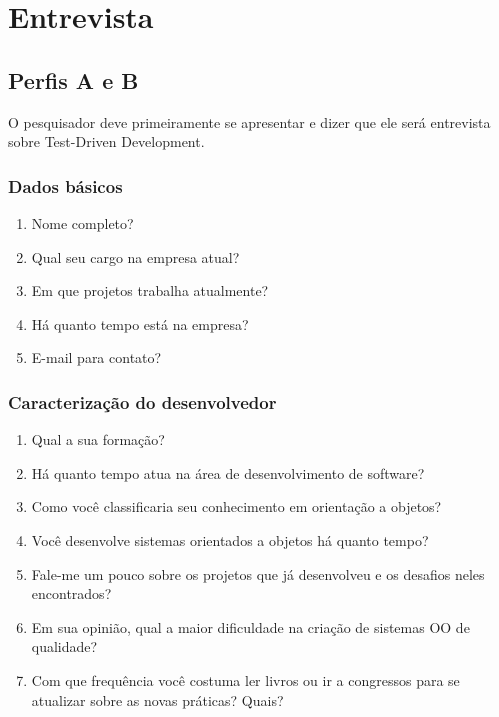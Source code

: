 \chapter{Entrevista}
\label{ape:entrevista}

\section{Perfis A e B}

O pesquisador deve primeiramente se apresentar e dizer que ele será entrevista
sobre Test-Driven Development.

\subsection{Dados básicos}

\begin{enumerate}
	\item Nome completo?

	\item Qual seu cargo na empresa atual?
	
	\item Em que projetos trabalha atualmente?
	
	\item Há quanto tempo está na empresa?

	\item E-mail para contato?

\end{enumerate}

\subsection{Caracterização do desenvolvedor}

\begin{enumerate}
	\item Qual a sua formação?

	\item Há quanto tempo atua na área de desenvolvimento de software?

	\item Como você classificaria seu conhecimento em orientação a objetos?

	\item Você desenvolve sistemas orientados a objetos há quanto tempo?	

	\item Fale-me um pouco sobre os projetos que já desenvolveu e os desafios 
	neles encontrados?

	\item Em sua opinião, qual a maior dificuldade na criação de sistemas OO de
	qualidade?

	\item Com que frequência você costuma ler livros ou ir a congressos para se 
	atualizar sobre as novas práticas? Quais?

\end{enumerate}

